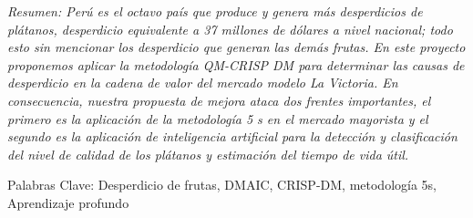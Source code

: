 \documentclass[11pt]{article}
\begin{document}
\begin{spacing}{0.95}
\footnotesize\noindent\itshape Resumen: Perú es el octavo país que produce y genera más desperdicios de plátanos, desperdicio equivalente a
37 millones de dólares a nivel nacional; todo esto sin mencionar los desperdicio que generan las demás frutas.
En este proyecto proponemos aplicar la metodología QM-CRISP DM para determinar las causas de desperdicio
en la cadena de valor del mercado modelo La Victoria. En consecuencia, nuestra propuesta de mejora ataca dos
frentes importantes, el primero es la aplicación de la metodología 5 s en el mercado mayorista y el segundo es
la aplicación de inteligencia artificial para la detección y clasificación del nivel de calidad de los plátanos y
estimación del tiempo de vida útil.
\vspace{-0.2cm}
\begin{center}
    Palabras Clave: Desperdicio de frutas, DMAIC, CRISP-DM, metodología 5s, Aprendizaje profundo
\end{center}
\end{spacing}
\tableofcontents





\end{document}
